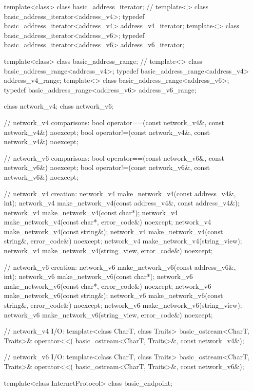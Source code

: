 \begin{codeblock}
{{{{{  template<class> class basic_address_iterator; // \notdef
  template<> class basic_address_iterator<address_v4>;
  typedef basic_address_iterator<address_v4> address_v4_iterator;
  template<> class basic_address_iterator<address_v6>;
  typedef basic_address_iterator<address_v6> address_v6_iterator;

  template<class> class basic_address_range; // \notdef
  template<> class basic_address_range<address_v4>;
  typedef basic_address_range<address_v4> address_v4_range;
  template<> class basic_address_range<address_v6>;
  typedef basic_address_range<address_v6> address_v6_range;

  class network_v4;
  class network_v6;

  // network_v4 comparisons:
  bool operator==(const network_v4&, const network_v4&) noexcept;
  bool operator!=(const network_v4&, const network_v4&) noexcept;

  // network_v6 comparisons:
  bool operator==(const network_v6&, const network_v6&) noexcept;
  bool operator!=(const network_v6&, const network_v6&) noexcept;

  // network_v4 creation:
  network_v4 make_network_v4(const address_v4&, int);
  network_v4 make_network_v4(const address_v4&, const address_v4&);
  network_v4 make_network_v4(const char*);
  network_v4 make_network_v4(const char*, error_code&) noexcept;
  network_v4 make_network_v4(const string&);
  network_v4 make_network_v4(const string&, error_code&) noexcept;
  network_v4 make_network_v4(string_view);
  network_v4 make_network_v4(string_view, error_code&) noexcept;

  // network_v6 creation:
  network_v6 make_network_v6(const address_v6&, int);
  network_v6 make_network_v6(const char*);
  network_v6 make_network_v6(const char*, error_code&) noexcept;
  network_v6 make_network_v6(const string&);
  network_v6 make_network_v6(const string&, error_code&) noexcept;
  network_v6 make_network_v6(string_view);
  network_v6 make_network_v6(string_view, error_code&) noexcept;

  // network_v4 I/O:
  template<class CharT, class Traits>
    basic_ostream<CharT, Traits>& operator<<(
      basic_ostream<CharT, Traits>&, const network_v4&);

  // network_v6 I/O:
  template<class CharT, class Traits>
    basic_ostream<CharT, Traits>& operator<<(
      basic_ostream<CharT, Traits>&, const network_v6&);

  template<class InternetProtocol>
    class basic_endpoint;

}}}}}
\end{codeblock}
